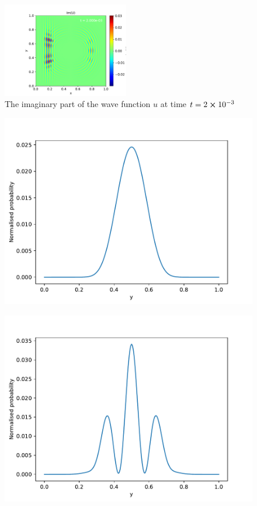 \documentclass[english,notitlepage,reprint,nofootinbib]{revtex4-2}  %
\begin{document}
	\begin{figure}[h!]
		\centering
		\includegraphics[trim={1cm 0cm 1cm 0cm},clip,width=0.49\textwidth]{figures/problem8_U_Im_0.002.pdf}
		\caption{The imaginary part of the wave function $u$ at time $t = 2\cross10^{-3}$}
		\label{fig:prob8_Im2}
	\end{figure}

	\begin{figure}[h!]
		\centering
		\includegraphics[scale=0.55]{figures/problem9_single_slit.pdf}
		\caption{}
		\label{fig:prob9_single}
	\end{figure}
	
	\begin{figure}[h!]
		\centering
		\includegraphics[scale=0.55]{figures/problem9_double_slit.pdf}
		\caption{}
		\label{fig:prob9_double}
	\end{figure}
	
\end{document}
